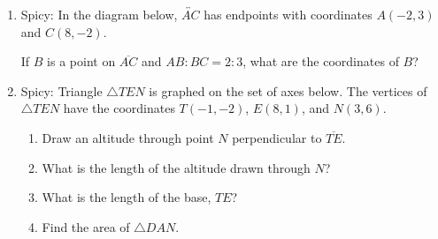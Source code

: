 \begin{enumerate}
\item Spicy: In the diagram below, $\overleftrightarrow{AC}$ has endpoints with coordinates $A(-2,3)$ and $C(8, -2)$.
  \begin{center} %
  \end{center}
  If $B$ is a point on $\overline{AC}$ and $AB {:} BC = 2{:}3$,  what  are  the  coordinates of $B$?

\newpage
\item Spicy: Triangle $\triangle TEN$ is graphed on the set of axes below. The vertices of $\triangle TEN$ have the coordinates $T(-1,-2)$, $E(8,1)$, and $N(3,6)$.
  \begin{center} %
  \end{center}
  \begin{enumerate}
  \item Draw an altitude through point $N$ perpendicular to $\overline{TE}$.
  \item What is the length of the altitude drawn through $N$? \vspace{3.5cm}
  \item What is the length of the base, $TE$?  \vspace{3.5cm}
  \item Find the area of  $\triangle DAN$.
  \end{enumerate}




\end{enumerate}

